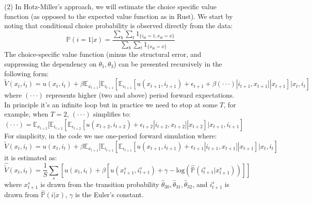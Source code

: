 \documentclass[paper=a4, fontsize=11pt]{scrartcl} %
\numberwithin{equation}{section} %
\numberwithin{figure}{section} %
\numberwithin{table}{section} %
\begin{document}
\begin{itemize}
\begin{itemize}
\item[(2)] In Hotz-Miller's approach, we will estimate the choice specific value function (as opposed to the expected value function as in Rust). We start by noting that conditional choice probability is observed directly from the data:
\[\hat{\mathbb{P}}(i=1|x) = \frac{\sum_{b}\sum_{t} 1_{\{i_{bt}=1, x_{bt}=x\}}}{\sum_{b}\sum_{t} 1_{\{x_{bt}=x\}}}\]
The choice-specific value function (minus the structural error, and suppressing the dependency on $\theta_1, \theta_3$) can be presented recursively in the following form:
\[\tilde{V}(x_t,i_t) = u(x_t,i_t)+\beta\mathbb{E}_{x_{t+1}}[\mathbb{E}_{i_{t+1}}[\mathbb{E}_{\epsilon_{t+1}}[u(x_{t+1},i_{t+1})+\epsilon_{t+1}+\beta(\cdot\cdot\cdot)|i_{t+1},x_{t+1}]|x_{t+1}]|x_t,i_t]\]
where $(\cdot\cdot\cdot)$ represents higher (two and above) period forward expectations. In principle it's an infinite loop but in practice we need to stop at some $T$, for example, when $T=2$, $(\cdot\cdot\cdot)$ simplifies to:
\[(\cdot\cdot\cdot) = \mathbb{E}_{x_{t+2}}[\mathbb{E}_{i_{t+2}}[\mathbb{E}_{\epsilon_{t+2}}[u(x_{t+2},i_{t+2})+\epsilon_{t+2}|i_{t+2},x_{t+2}]|x_{t+2}]|x_{t+1},i_{t+1}]\]
For simplicity, in the code we use one-period forward simulation where:
\[\tilde{V}(x_t,i_t) = u(x_t,i_t)+\beta\mathbb{E}_{x_{t+1}}[\mathbb{E}_{i_{t+1}}[\mathbb{E}_{\epsilon_{t+1}}[u(x_{t+1},i_{t+1})+\epsilon_{t+1}|i_{t+1},x_{t+1}]|x_{t+1}]|x_t,i_t]\]
it is estimated as:
\[\hat{\tilde{V}}(x_t,i_t) = \frac{1}{S} \sum_{s} [u(x_t,i_t)+\beta[u(x^s_{t+1},i^s_{t+1})+\gamma -\text{log}(\hat{\mathbb{P}}(i^s_{t+1}|x^s_{t+1}))]]\]
where $x^s_{t+1}$ is drawn from the transition probability $\hat{\theta}_{30}, \hat{\theta}_{31}, \hat{\theta}_{32}$, and $i^s_{t+1}$ is drawn from $\hat{\mathbb{P}}(i|x)$, $\gamma$ is the Euler's constant. 


\end{itemize}

\end{itemize}
\end{document}

